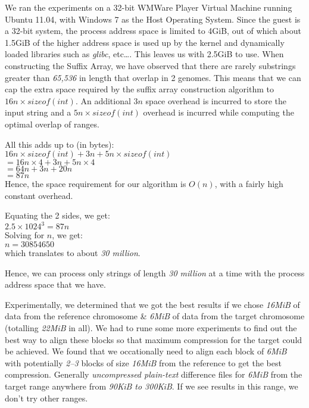 \documentclass[11pt]{article}
\begin{document}
We ran the experiments on a 32-bit WMWare Player Virtual Machine
running Ubuntu 11.04, with Windows 7 as the Host Operating
System. Since the guest is a 32-bit system, the process address space
is limited to 4GiB, out of which about 1.5GiB of the higher address
space is used up by the kernel and dynamically loaded libraries such
as \textit{glibc}, etc\ldots{}. This leaves us with 2.5GiB to
use. When constructing the Suffix Array, we have observed that there
are rarely substrings greater than \textit{65,536} in length that
overlap in 2 genomes. This means that we can cap the extra space
required by the suffix array construction algorithm to $16n \times
sizeof(int)$. An additional $3n$ space overhead is incurred to store
the input string and a $5n \times sizeof(int)$ overhead is incurred
while computing the optimal overlap of ranges.

All this adds up to (in bytes):\\
$16n \times sizeof(int) + 3n + 5n \times sizeof(int)$\\
$= 16n \times 4 + 3n + 5n \times 4$\\
$= 64n + 3n + 20n$\\
$= 87n$\\

Hence, the space requirement for our algorithm is $O(n)$, with a
fairly high constant overhead.

Equating the 2 sides, we get:\\
$2.5 \times 1024^3 = 87n$\\
Solving for $n$, we get:\\
$n = 30854650$\\
which translates to about \textit{30 million}.

Hence, we can process only strings of length \textit{30 million} at a
time with the process address space that we have.

Experimentally, we determined that we got the best results if we chose
\textit{16MiB} of data from the reference chromosome \& \textit{6MiB}
of data from the target chromosome (totalling \textit{22MiB} in
all). We had to rune some more experiments to find out the best way to
align these blocks so that maximum compression for the target could be
achieved. We found that we occationally need to align each block of
\textit{6MiB} with potentially \textit{2--3} blocks of size
\textit{16MiB} from the reference to get the best
compression. Generally \textit{uncompressed plain-text} difference
files for \textit{6MiB} from the target range anywhere from
{\textit{90KiB to 300KiB}}. If we see results in this range, we don't
try other ranges.
\end{document}
